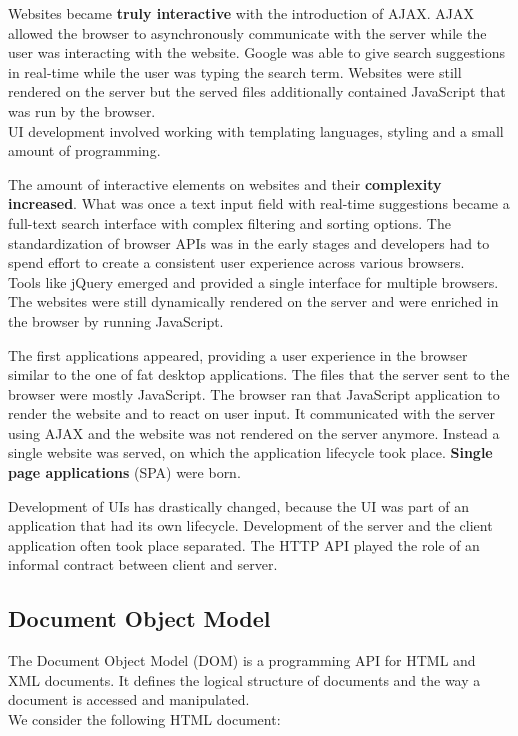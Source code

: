 Websites became \textbf{truly interactive} with the introduction of AJAX. AJAX allowed the browser to asynchronously communicate with the server while the user was interacting with the website. Google was able to give search suggestions in real-time while the user was typing the search term. Websites were still rendered on the server but the served files additionally contained JavaScript that was run by the browser.
\\ UI development involved working with templating languages, styling and a small amount of programming.

The amount of interactive elements on websites and their \textbf{complexity increased}. What was once a text input field with real-time suggestions became a full-text search interface with complex filtering and sorting options. The standardization of browser APIs was in the early stages and developers had to spend effort to create a consistent user experience across various browsers.
\\ Tools like \gls{jQuery} emerged and provided a single interface for multiple browsers. The websites were still dynamically rendered on the server and were enriched in the browser by running JavaScript.

The first applications appeared, providing a user experience in the browser similar to the one of \gls{fat desktop applications}. The files that the server sent to the browser were mostly JavaScript. The browser ran that JavaScript application to render the website and to react on user input. It communicated with the server using \gls{AJAX} and the website was not rendered on the server anymore. Instead a single website was served, on which the application lifecycle took place. \textbf{Single page applications} (SPA) were born.
\par Development of UIs has drastically changed, because the UI was part of an application that had its own lifecycle. Development of the server and the client application often took place separated. The HTTP API played the role of an informal contract between client and server.

\subsection{Document Object Model}\label{documentobjectmodel}
The Document Object Model (DOM) is a programming API for HTML and XML documents. It defines the logical structure of documents and the way a document is accessed and manipulated. \citep{domintro} \\ We consider the following HTML document:

